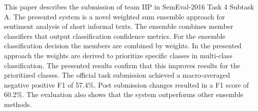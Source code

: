This paper describes the submission of team IIP in SemEval-2016 Task 4 Subtask A. The presented system is a novel weighted sum ensemble approach for sentiment analysis of short informal texts. The ensemble combines member classifiers that output classification confidence metrics. For the ensemble classification decision the members are combined by weights. In the presented approach the weights are derived to prioritize specific classes in multi-class classification. The presented results confirm that this improves results for the prioritized classes. The official task submission achieved a macro-averaged negative positive F1 of 57.4\%. Post submission changes resulted in a F1 score of 60.2\%. The evaluation also shows that the system outperforms other ensemble methods.
